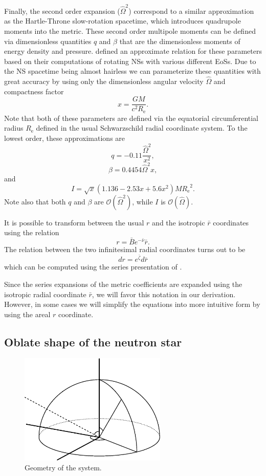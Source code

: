 \documentclass[iop, usenatbib]{emulateapj}
\newcommand{\be}{\begin{equation}}
\newcommand{\ee}{\end{equation}}
\newcommand{\Req}{\ensuremath{R_{\mathrm{e}}}}
\newcommand{\sch}{Schwarzschild }
\newcommand{\rb}{\ensuremath{\bar{r}}}
\newcommand{\Ob}{\ensuremath{\hat{\Omega}}}
\newcommand{\nub}{\ensuremath{\bar{\nu}}}
\newcommand{\zetab}{\ensuremath{\bar{\zeta}}}
\newcommand{\Bb}{\ensuremath{\bar{B}}}
\begin{document}
Finally, the second order expansion ($\Ob^2$) correspond to a similar approximation as the Hartle-Throne slow-rotation spacetime, which introduces quadrupole moments into the metric.  
These second order multipole moments can be defined via dimensionless quantities $q$ and $\beta$ that are the dimensionless moments of energy density and pressure.  
\citet{aGM14} defined an approximate relation for these parameters based on their computations of rotating NSs with various different EoSs.  
Due to the NS spacetime being almost hairless we can parameterize these quantities with great accuracy by using only the dimensionless angular velocity $\Ob$ and compactness factor
\be
x = \frac{G M}{c^2 \Req}.
\ee
Note that both of these parameters are defined via the equatorial circumferential radius $\Req$ defined in the usual \sch radial coordinate system.
To the lowest order, these approximations are
\be\label{eq:quad}
q = -0.11 \frac{\Ob^2}{x^2},
\ee
\be\label{eq:beta}
\beta = 0.4454 \Ob^2 x,
\ee
and
\be
I = \sqrt{x} (1.136 - 2.53 x + 5.6 x^2) M \Req^2.
\ee
Note also that both $q$ and $\beta$ are $\mathcal{O}(\Ob^2)$, while $I$ is $\mathcal{O}(\Ob)$.
    
It is possible to transform between the usual $r$ and the isotropic $\rb$ coordinates using the relation \citep{FIP86}
\be\label{eq:rb2r}
r = \Bb e^{-\nub} \rb.
\ee
The relation between the two infinitesimal radial coordinates turns out to be
\be\label{eq:drb2dr}
dr = e^{\zetab} d\rb
\ee
which can be computed using the series presentation of \cite{BI76}.

Since the series expansions of the metric coefficients are expanded using the isotropic radial coordinate $\rb$, we will favor this notation in our derivation.  
However, in some cases we will simplify the equations into more intuitive form by using the areal $r$ coordinate.


\subsection{Oblate shape of the neutron star}

\begin{figure}
\centering
\includegraphics[width=7cm]{figs/fig1.eps}
\caption{\label{fig:geom}
  Geometry of the system.
}
\end{figure}
\end{document}
